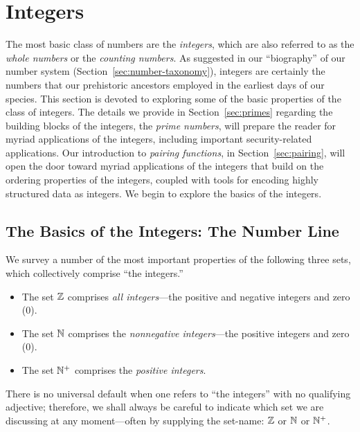 \section{Integers}
\label{sec:integers}

The most basic class of numbers are the {\it integers},
which are also referred to as the {\it whole numbers}
or the {\em counting numbers}.
%
As suggested in our ``biography'' of our number system
(Section~\ref{sec:number-taxonomy}), integers are certainly the
numbers that our prehistoric ancestors employed in the earliest days
of our species.  This section is devoted to exploring some of the
basic properties of the class of integers.  The details we provide in
Section~\ref{sec:primes} regarding the building blocks of the
integers, the {\it prime numbers},  will prepare
the reader for myriad applications of the integers, including
important security-related applications.  Our introduction to {\it
  pairing functions},  in
Section~\ref{sec:pairing}, will open the door toward myriad
applications of the integers that build on the ordering properties of
the integers, coupled with tools for encoding highly structured data
as integers.  We begin to explore the basics of the integers.

\subsection{The Basics of the Integers: The Number Line}
\label{sec:integer-number-line}

We survey a number of the most important properties of the following
three sets, which collectively comprise ``the integers.''
\begin{itemize}
\item
The set $\mathbb{Z}$
comprises {\em all integers}---the positive and negative integers and
zero ($0$).
\item
The set $\mathbb{N}$
comprises the {\em nonnegative integers}---the positive integers and
zero ($0$).
\item
The set $\mathbb{N}^+$
comprises the {\em positive integers}.
\end{itemize}
There is no universal default when one refers to ``the integers'' with
no qualifying adjective; therefore, we shall always be careful to
indicate which set we are discussing at any moment---often by
supplying the set-name: $\mathbb{Z}$ or $\mathbb{N}$ or $\mathbb{N}^+$.

